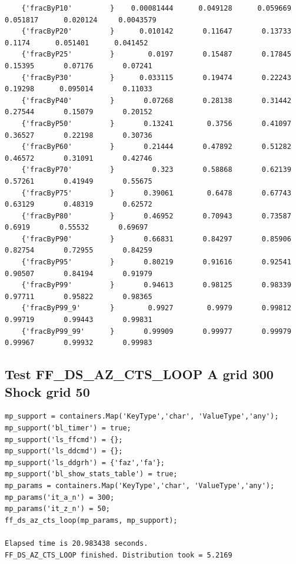 \documentclass[
]{book}
\begin{document}
\begin{verbatim}
    {'fracByP10'         }    0.00081444      0.049128      0.059669      0.051817      0.020124     0.0043579 
    {'fracByP20'         }      0.010142       0.11647       0.13733        0.1174      0.051401      0.041452 
    {'fracByP25'         }        0.0197       0.15487       0.17845       0.15395       0.07176       0.07241 
    {'fracByP30'         }      0.033115       0.19474       0.22243       0.19298      0.095014       0.11033 
    {'fracByP40'         }       0.07268       0.28138       0.31442       0.27544       0.15079       0.20152 
    {'fracByP50'         }       0.13241        0.3756       0.41097       0.36527       0.22198       0.30736 
    {'fracByP60'         }       0.21444       0.47892       0.51282       0.46572       0.31091       0.42746 
    {'fracByP70'         }         0.323       0.58868       0.62139       0.57261       0.41949       0.55675 
    {'fracByP75'         }       0.39061        0.6478       0.67743       0.63129       0.48319       0.62572 
    {'fracByP80'         }       0.46952       0.70943       0.73587        0.6919       0.55532       0.69697 
    {'fracByP90'         }       0.66831       0.84297       0.85906       0.82754       0.72955       0.84259 
    {'fracByP95'         }       0.80219       0.91616       0.92541       0.90507       0.84194       0.91979 
    {'fracByP99'         }       0.94613       0.98125       0.98339       0.97711       0.95822       0.98365 
    {'fracByP99_9'       }        0.9927        0.9979       0.99812       0.99719       0.99443       0.99831 
    {'fracByP99_99'      }       0.99909       0.99977       0.99979       0.99967       0.99932       0.99983 
\end{verbatim}

\hypertarget{test-ff_ds_az_cts_loop-a-grid-300-shock-grid-50}{%
\subsection{Test FF\_DS\_AZ\_CTS\_LOOP A grid 300 Shock grid 50}\label{test-ff_ds_az_cts_loop-a-grid-300-shock-grid-50}}

\begin{verbatim}
mp_support = containers.Map('KeyType','char', 'ValueType','any');
mp_support('bl_timer') = true;
mp_support('ls_ffcmd') = {};
mp_support('ls_ddcmd') = {};
mp_support('ls_ddgrh') = {'faz','fa'};
mp_support('bl_show_stats_table') = true;
mp_params = containers.Map('KeyType','char', 'ValueType','any');
mp_params('it_a_n') = 300;
mp_params('it_z_n') = 50;
ff_ds_az_cts_loop(mp_params, mp_support);

Elapsed time is 20.983438 seconds.
FF_DS_AZ_CTS_LOOP finished. Distribution took = 5.2169
\end{verbatim}
\end{document}
